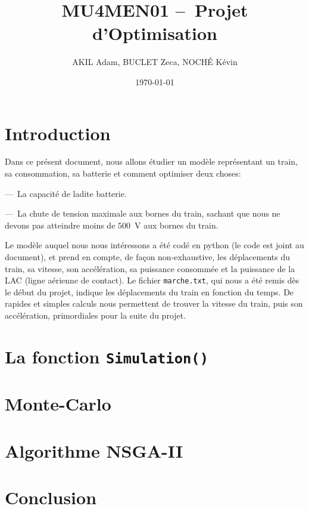 \documentclass[11pt, a4paper, oneside, portrait]{report}
\title{\textbf{MU4MEN01 --~Projet d'Optimisation}}
\author{AKIL Adam, BUCLET Zeca, NOCHÉ Kévin} %
\date{\today}
\begin{document}
    \maketitle\thispagestyle{empty} %
    \newpage\tableofcontents\thispagestyle{empty}

    \newpage\setcounter{page}{1} %


    \section*{Introduction}
        Dans ce présent document, nous allons étudier un modèle représentant un train, sa consommation, sa batterie et comment optimiser deux choses:

        ---~La capacité de ladite batterie.

        ---~La chute de tension maximale aux bornes du train, sachant que nous ne devons pas atteindre moins de $500$~V aux bornes du train.

        Le modèle auquel nous nous intéressons a été codé en python (le code est joint au document), et prend en compte, de façon non-exhaustive, les déplacements du train, sa vitesse, son accélération, sa puissance consommée et la puissance de la LAC (ligne aérienne de contact).
        Le fichier \texttt{marche.txt}, qui nous a été remis dès le début du projet, indique les déplacements du train en fonction du temps.
        De rapides et simples calculs nous permettent de trouver la vitesse du train, puis son accélération, primordiales pour la suite du projet.

    \section*{La fonction \texttt{Simulation()}}


    \section*{Monte-Carlo}


    \section*{Algorithme NSGA-II}


    \section*{Conclusion}
\end{document}
